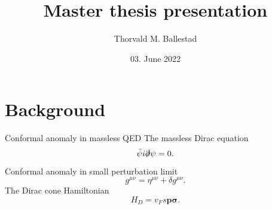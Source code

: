 \documentclass{beamer}
\author{Thorvald M. Ballestad}
\title{Master thesis presentation}
\date{03. June 2022}
\renewcommand\vec\bm
\begin{document}
\begin{frame}
\titlepage
\end{frame}

\section{Background}
\begin{frame}{Conformal anomaly in massless QED}
  The massless Dirac equation
  \begin{equation}
    \label{eq:1}
    \bar{\psi} i \slashed{\partial} \psi = 0.
  \end{equation}
  Conformal anomaly in small perturbation limit
  \begin{equation}
    \label{eq:5}
    g^{\mu \nu} = \eta^{\mu \nu} + \delta g^{\mu \nu}.
  \end{equation}
  The Dirac cone Hamiltonian
  \begin{equation}
    \label{eq:2}
    H_D = v_F s \vec{p} \vec{\sigma}.
  \end{equation}
\end{frame}
\end{document}
